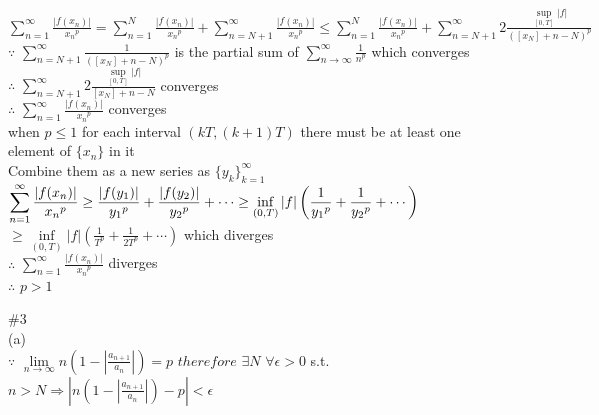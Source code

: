 \documentclass{article}
\begin{document}
$\displaystyle \sum \limits_{n=1}^\infty \frac{|f(x_n)|}{{x_n}^p} = \sum \limits_{n=1}^N \frac{|f(x_n)|}{{x_n}^p} + \sum \limits_{n=N+1}^\infty \frac{|f(x_n)|}{{x_n}^p} \leq \sum \limits_{n=1}^N \frac{|f(x_n)|}{{x_n}^p} + \sum \limits_{n=N+1}^\infty 2\frac{\sup \limits_{[0,T]}|f|}{\left([x_N]+n-N\right)^p}$\\

$\because$ \qquad $\displaystyle \sum \limits_{n=N+1}^\infty \frac{1}{\left([x_N]+n-N\right)^p}$ \quad is the partial sum of $\displaystyle \sum \limits_{n \to \infty}^\infty \frac{1}{n^p}$ \quad which converges\\

$\therefore$ \qquad $\displaystyle \sum \limits_{n=N+1}^\infty 2\frac{\sup \limits_{[0,T]}|f|}{[x_N]+n-N}$ \quad converges\\

$\therefore$ \qquad $\displaystyle \sum \limits_{n=1}^\infty \frac{|f(x_n)|}{{x_n}^p}$ converges\\

when $p \leq 1$ \quad for each interval $(kT, (k+1)T)$ there must be at least one element of $\{x_n\}$ in it\\

Combine them as a new series as $\{y_k\}_{k=1}^\infty$\\

$\displaystyle \sum \limits_{n=1}^\infty \frac{|f(x_n)|}{{x_n}^p} \geq 
\frac{|f(y_1)|}{{y_1}^p} + \frac{|f(y_2)|}{{y_2}^p} + \cdots \geq \inf \limits_{(0,T)}|f| \left(\frac{1}{{y_1}^p} + \frac{1}{{y_2}^p} + \cdots \right)\\$\\

\hskip 5.77cm$\displaystyle \geq \inf \limits_{(0,T)}|f| \left(\frac{1}{{T}^p} + \frac{1}{{2T}^p} + \cdots \right)$ \quad which diverges\\

$\therefore$ \qquad $\displaystyle \sum \limits_{n=1}^\infty \frac{|f(x_n)|}{{x_n}^p}$ \quad diverges\\

$\therefore$ \qquad $p > 1$\\

\vskip 2.8cm

\textcolor[rgb]{0.00,0.00,0.50}{\#3}\\

(a)\\

$\because$ \qquad $\displaystyle \lim \limits_{n \to \infty} n(1 - \left|\frac{a_{n+1}}{a_n}\right|) = p$ \qquad $therefore$ \qquad $\exists N$ \quad $\forall \epsilon > 0$ \quad s.t. \quad $\displaystyle n>N \Rightarrow \left|n(1-\left|\frac{a_{n+1}}{a_n}\right|) - p\right| < \epsilon$\\
\end{document}
